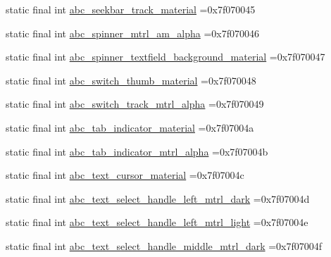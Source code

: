 \begin{DoxyCompactItemize}
\item 
static final int \mbox{\hyperlink{classbr_1_1unb_1_1cic_1_1mp_1_1marketmaster_1_1test_1_1R_1_1drawable_a5931e86bfc3528ed5cd58e96ac50bf28}{abc\+\_\+seekbar\+\_\+track\+\_\+material}} =0x7f070045
\item 
static final int \mbox{\hyperlink{classbr_1_1unb_1_1cic_1_1mp_1_1marketmaster_1_1test_1_1R_1_1drawable_a596adf06eb1b9c548ec815fc35aa07fe}{abc\+\_\+spinner\+\_\+mtrl\+\_\+am\+\_\+alpha}} =0x7f070046
\item 
static final int \mbox{\hyperlink{classbr_1_1unb_1_1cic_1_1mp_1_1marketmaster_1_1test_1_1R_1_1drawable_a1809f07705deb46eff967a9b3c442d10}{abc\+\_\+spinner\+\_\+textfield\+\_\+background\+\_\+material}} =0x7f070047
\item 
static final int \mbox{\hyperlink{classbr_1_1unb_1_1cic_1_1mp_1_1marketmaster_1_1test_1_1R_1_1drawable_aabd837145514e79c8044cb41ec9b6802}{abc\+\_\+switch\+\_\+thumb\+\_\+material}} =0x7f070048
\item 
static final int \mbox{\hyperlink{classbr_1_1unb_1_1cic_1_1mp_1_1marketmaster_1_1test_1_1R_1_1drawable_a9711b1420338b9e25eb9a465cdfa3553}{abc\+\_\+switch\+\_\+track\+\_\+mtrl\+\_\+alpha}} =0x7f070049
\item 
static final int \mbox{\hyperlink{classbr_1_1unb_1_1cic_1_1mp_1_1marketmaster_1_1test_1_1R_1_1drawable_a6785c954dd694376dd3f9b86ca49ce72}{abc\+\_\+tab\+\_\+indicator\+\_\+material}} =0x7f07004a
\item 
static final int \mbox{\hyperlink{classbr_1_1unb_1_1cic_1_1mp_1_1marketmaster_1_1test_1_1R_1_1drawable_ab2d0cf8718cb148d5e9d748f02bd459d}{abc\+\_\+tab\+\_\+indicator\+\_\+mtrl\+\_\+alpha}} =0x7f07004b
\item 
static final int \mbox{\hyperlink{classbr_1_1unb_1_1cic_1_1mp_1_1marketmaster_1_1test_1_1R_1_1drawable_a831e3e091a07d2c1e9e7aa5f95080259}{abc\+\_\+text\+\_\+cursor\+\_\+material}} =0x7f07004c
\item 
static final int \mbox{\hyperlink{classbr_1_1unb_1_1cic_1_1mp_1_1marketmaster_1_1test_1_1R_1_1drawable_a1fa1e9195a041bd554d1f168163f689a}{abc\+\_\+text\+\_\+select\+\_\+handle\+\_\+left\+\_\+mtrl\+\_\+dark}} =0x7f07004d
\item 
static final int \mbox{\hyperlink{classbr_1_1unb_1_1cic_1_1mp_1_1marketmaster_1_1test_1_1R_1_1drawable_a82ec43f8a19b699abbe14e36cde5b353}{abc\+\_\+text\+\_\+select\+\_\+handle\+\_\+left\+\_\+mtrl\+\_\+light}} =0x7f07004e
\item 
static final int \mbox{\hyperlink{classbr_1_1unb_1_1cic_1_1mp_1_1marketmaster_1_1test_1_1R_1_1drawable_a9c8f05e546cb55bcbb550518064732b7}{abc\+\_\+text\+\_\+select\+\_\+handle\+\_\+middle\+\_\+mtrl\+\_\+dark}} =0x7f07004f

\end{DoxyCompactItemize}
